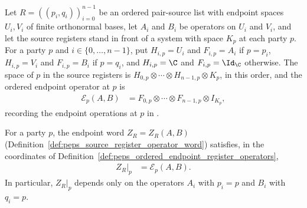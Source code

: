 \begin{definition}
    \label{def:peps_ordered_endpoint_register_operators}
    \leanok
    Let $R=((p_i,q_i))_{i=0}^{n-1}$ be an ordered pair-source list with
    endpoint spaces $U_i,V_i$ of finite orthonormal bases, let $A_i$ and $B_i$
    be operators on $U_i$ and $V_i$, and let the source registers stand in
    front of a system with space $K_p$ at each party $p$. For a party $p$ and
    $i\in\{0,\ldots,n-1\}$, put $H_{i,p}=U_i$ and $F_{i,p}=A_i$ if $p=p_i$,
    $H_{i,p}=V_i$ and $F_{i,p}=B_i$ if $p=q_i$, and $H_{i,p}=\C$ and
    $F_{i,p}=\Id_{\C}$ otherwise. The space of $p$ in the source registers is
    $H_{0,p}\otimes\cdots\otimes H_{n-1,p}\otimes K_p$, in this order, and the
    ordered endpoint operator at $p$ is
    \begin{align}
        \mathcal E_p(A,B)
         & =F_{0,p}\otimes\cdots\otimes F_{n-1,p}\otimes I_{K_p},
        \label{eq:peps_ordered_endpoint_data}
    \end{align}
    recording the endpoint operations at $p$ in
    \cite[proof of Theorem~5.2]{OpenAI2026PolynomialPEPS}.
\end{definition}

\begin{lemma}
    \label{thm:peps_restricted_ordered_endpoint_operators}
    \leanok
    For a party $p$, the endpoint word $Z_R=Z_R(A,B)$
    (Definition~\ref{def:peps_source_register_operator_word}) satisfies, in
    the coordinates of Definition~\ref{def:peps_ordered_endpoint_register_operators},
    \begin{align}
        Z_R|_p & =\mathcal E_p(A,B).
        \label{eq:peps_restricted_ordered_endpoint_operators}
    \end{align}
    In particular, $Z_R|_p$ depends only on the operators $A_i$ with $p_i=p$
    and $B_i$ with $q_i=p$.
\end{lemma}

